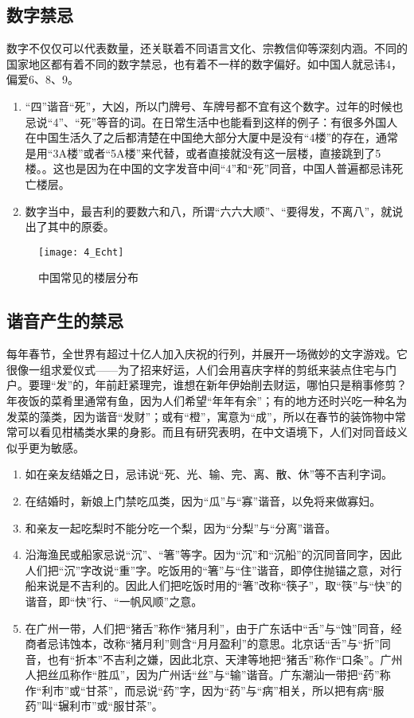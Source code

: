 \subsection{数字禁忌}

    数字不仅仅可以代表数量，还关联着不同语言文化、宗教信仰等深刻内涵。不同的国家地区都有着不同的数字禁忌，也有着不一样的数字偏好。如中国人就忌讳4，偏爱6、8、9。
    \begin{enumerate}
    \item 
    “四”谐音“死”，大凶，所以门牌号、车牌号都不宜有这个数字。过年的时候也忌说“4”、“死”等音的词。在日常生活中也能看到这样的例子：有很多外国人在中国生活久了之后都清楚在中国绝大部分大厦中是没有“4楼”的存在，通常是用“3A楼”或者“5A楼”来代替，或者直接就没有这一层楼，直接跳到了5楼。。这也是因为在中国的文字发音中间“4”和“死”同音，中国人普遍都忌讳死亡楼层。
    \item 
    数字当中，最吉利的要数六和八，所谓“六六大顺”、“要得发，不离八”，就说出了其中的原委。　　
        
    \end{enumerate}
\begin{figure}
    \centering
    \texttt{[image: 4\_Echt]}
    \caption{中国常见的楼层分布}
\end{figure}


\subsection{谐音产生的禁忌}

    每年春节，全世界有超过十亿人加入庆祝的行列，并展开一场微妙的文字游戏。它很像一组求爱仪式——为了招来好运，人们会用喜庆字样的剪纸来装点住宅与门户。要理“发”的，年前赶紧理完，谁想在新年伊始削去财运，哪怕只是稍事修剪？年夜饭的菜肴里通常有鱼，因为人们希望“年年有余”；有的地方还时兴吃一种名为发菜的藻类，因为谐音“发财”；或有“橙”，寓意为“成”，所以在春节的装饰物中常常可以看见柑橘类水果的身影。而且有研究表明，在中文语境下，人们对同音歧义似乎更为敏感。
    \begin{enumerate}
    \item 
   如在亲友结婚之日，忌讳说“死、光、输、完、离、散、休”等不吉利字词。
   \item 
   在结婚时，新娘上门禁吃瓜类，因为“瓜”与“寡”谐音，以免将来做寡妇。
   \item 
   和亲友一起吃梨时不能分吃一个梨，因为“分梨”与“分离”谐音。
   \item 
   沿海渔民或船家忌说“沉”、“箸”等字。因为“沉”和“沉船”的沉同音同字，因此人们把“沉”字改说“重”字。吃饭用的“箸”与“住”谐音，即停住抛锚之意，对行船来说是不吉利的。因此人们把吃饭时用的“箸”改称“筷子”，取“筷”与“快”的谐音，即“快”行、“一帆风顺”之意。
   \item 
   在广州一带，人们把“猪舌”称作“猪月利”，由于广东话中“舌”与“蚀”同音，经商者忌讳蚀本，改称“猪月利”则含“月月盈利”的意思。北京话“舌”与“折”同音，也有“折本”不吉利之嫌，因此北京、天津等地把“猪舌”称作“口条”。广州人把丝瓜称作“胜瓜”，因为广州话“丝”与“输”谐音。广东潮汕一带把“药”称作“利市”或“甘茶”，而忌说“药”字，因为“药”与“病”相关，所以把有病“服药”叫“辗利市”或“服甘茶”。
        
    \end{enumerate}

